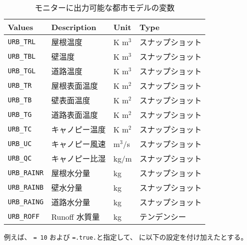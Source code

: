 \begin{table}[h]
\begin{center}
  \caption{モニターに出力可能な都市モデルの変数}
  \label{tab:varlist_monitor_urban}
  \begin{tabularx}{150mm}{|l|X|l|l|} \hline
    \rowcolor[gray]{0.9}  Values & Description & Unit & Type \\ \hline
      \verb|URB_TRL|    & 屋根温度      & K m$^3$ & スナップショット \\
      \verb|URB_TBL|    & 壁温度        & K m$^3$ & スナップショット \\
      \verb|URB_TGL|    & 道路温度      & K m$^3$ & スナップショット \\
      \verb|URB_TR|     & 屋根表面温度  & K m$^2$ & スナップショット \\
      \verb|URB_TB|     & 壁表面温度    & K m$^2$ & スナップショット \\
      \verb|URB_TG|     & 道路表面温度   & K m$^2$ & スナップショット \\
      \verb|URB_TC|     & キャノピー温度 & K m$^2$ & スナップショット \\
      \verb|URB_UC|     & キャノピー風速 & m$^3$/s & スナップショット \\
      \verb|URB_QC|     & キャノピー比湿 & kg/m & スナップショット \\
      \verb|URB_RAINR|  & 屋根水分量    & kg   & スナップショット \\
      \verb|URB_RAINB|  & 壁水分量      & kg   & スナップショット \\
      \verb|URB_RAING|  & 道路水分量    & kg   & スナップショット \\
      \verb|URB_ROFF|   & Runoff 水質量 & kg   & テンデンシー \\
    \hline
  \end{tabularx}
\end{center}
\end{table}


例えば、  \verb|= 10| および \verb|=.true.|と指定して、
に以下の設定を付け加えたとする。


